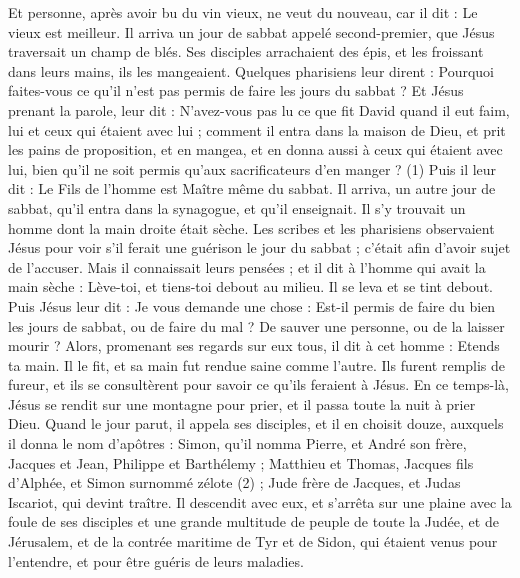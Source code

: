\begin{multicols}{2}
Et personne, après avoir bu du vin vieux, ne veut du nouveau, car il dit : Le vieux est meilleur.
\VerseOne{}Il arriva un jour de sabbat appelé second-premier, que Jésus traversait un champ de blés. Ses disciples arrachaient des épis, et les froissant dans leurs mains, ils les mangeaient.
Quelques pharisiens leur dirent : Pourquoi faites-vous ce qu’il n’est pas permis de faire les jours du sabbat ?
Et Jésus prenant la parole, leur dit : N'avez-vous pas lu ce que fit David quand il eut faim, lui et ceux qui étaient avec lui ;
comment il entra dans la maison de Dieu, et prit les pains de proposition, et en mangea, et en donna aussi à ceux qui étaient avec lui, bien qu’il ne soit permis qu'aux sacrificateurs d'en manger ? (1)
Puis il leur dit : Le Fils de l'homme est Maître même du sabbat.
Il arriva, un autre jour de sabbat, qu'il entra dans la synagogue, et qu'il enseignait. Il s’y trouvait un homme dont la main droite était sèche.
Les scribes et les pharisiens observaient Jésus pour voir s’il ferait une guérison le jour du sabbat ; c’était afin d’avoir sujet de l’accuser.
Mais il connaissait leurs pensées ; et il dit à l'homme qui avait la main sèche : Lève-toi, et tiens-toi debout au milieu. Il se leva et se tint debout.
Puis Jésus leur dit : Je vous demande une chose : Est-il permis de faire du bien les jours de sabbat, ou de faire du mal ? De sauver une personne, ou de la laisser mourir ?
Alors, promenant ses regards sur eux tous, il dit à cet homme : Etends ta main. Il le fit, et sa main fut rendue saine comme l'autre.
Ils furent remplis de fureur, et ils se consultèrent pour savoir ce qu’ils feraient à Jésus.
En ce temps-là, Jésus se rendit sur une montagne pour prier, et il passa toute la nuit à prier Dieu.
Quand le jour parut, il appela ses disciples, et il en choisit douze, auxquels il donna le nom d’apôtres :
Simon, qu'il nomma Pierre, et André son frère, Jacques et Jean, Philippe et Barthélemy ;
Matthieu et Thomas, Jacques fils d'Alphée, et Simon surnommé zélote (2) ;
Jude frère de Jacques, et Judas Iscariot, qui devint traître.
Il descendit avec eux, et s'arrêta sur une plaine avec la foule de ses disciples et une grande multitude de peuple de toute la Judée, et de Jérusalem, et de la contrée maritime de Tyr et de Sidon, qui étaient venus pour l'entendre, et pour être guéris de leurs maladies.

\end{multicols}
